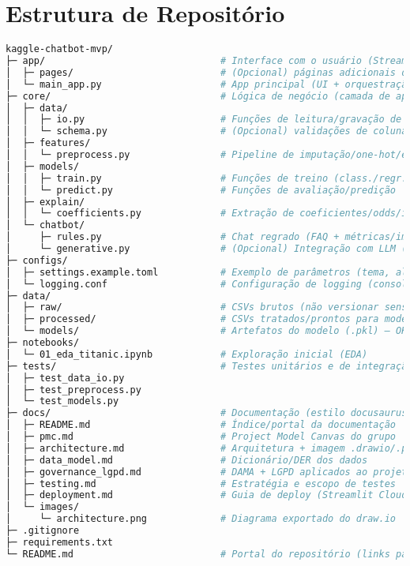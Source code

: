\documentclass[12pt,a4paper]{article}
\begin{document}
\clearpage
\section{Estrutura de Repositório}
\begin{lstlisting}[language=bash]
kaggle-chatbot-mvp/
├─ app/                               # Interface com o usuário (Streamlit)
│  ├─ pages/                          # (Opcional) páginas adicionais do Streamlit
│  └─ main_app.py                     # App principal (UI + orquestração)
├─ core/                              # Lógica de negócio (camada de aplicação)
│  ├─ data/
│  │  ├─ io.py                        # Funções de leitura/gravação de CSV
│  │  └─ schema.py                    # (Opcional) validações de colunas/tipos
│  ├─ features/
│  │  └─ preprocess.py                # Pipeline de imputação/one-hot/escala
│  ├─ models/
│  │  ├─ train.py                     # Funções de treino (class./regr.)
│  │  └─ predict.py                   # Funções de avaliação/predição
│  ├─ explain/
│  │  └─ coefficients.py              # Extração de coeficientes/odds/importâncias
│  └─ chatbot/
│     ├─ rules.py                     # Chat regrado (FAQ + métricas/importâncias)
│     └─ generative.py                # (Opcional) Integração com LLM (ChatGPT)
├─ configs/
│  ├─ settings.example.toml           # Exemplo de parâmetros (tema, alvo, etc.)
│  └─ logging.conf                    # Configuração de logging (console)
├─ data/
│  ├─ raw/                            # CSVs brutos (não versionar sensíveis)
│  ├─ processed/                      # CSVs tratados/prontos para modelagem
│  └─ models/                         # Artefatos do modelo (.pkl) — OK no MVP
├─ notebooks/
│  └─ 01_eda_titanic.ipynb            # Exploração inicial (EDA)
├─ tests/                             # Testes unitários e de integração
│  ├─ test_data_io.py
│  ├─ test_preprocess.py
│  └─ test_models.py
├─ docs/                              # Documentação (estilo docusaurus em .md)
│  ├─ README.md                       # Índice/portal da documentação
│  ├─ pmc.md                          # Project Model Canvas do grupo
│  ├─ architecture.md                 # Arquitetura + imagem .drawio/.png
│  ├─ data_model.md                   # Dicionário/DER dos dados
│  ├─ governance_lgpd.md              # DAMA + LGPD aplicados ao projeto
│  ├─ testing.md                      # Estratégia e escopo de testes
│  ├─ deployment.md                   # Guia de deploy (Streamlit Cloud/Render)
│  └─ images/
│     └─ architecture.png             # Diagrama exportado do draw.io
├─ .gitignore
├─ requirements.txt
└─ README.md                          # Portal do repositório (links para docs/)
\end{lstlisting}
\end{document}
